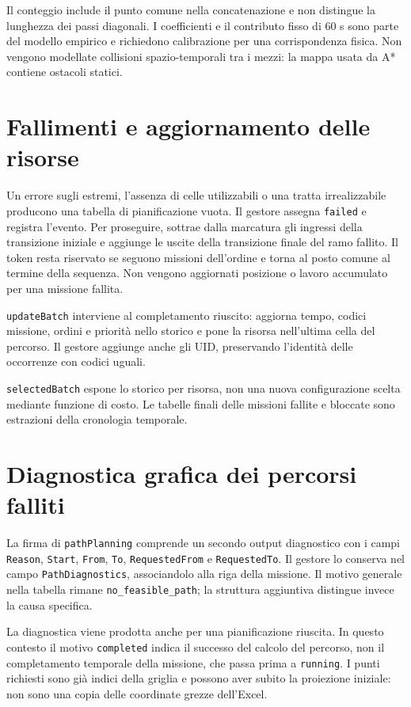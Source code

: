Il conteggio include il punto comune nella concatenazione e non distingue
la lunghezza dei passi diagonali. I coefficienti e il contributo fisso di
60 s sono parte del modello empirico e richiedono calibrazione per una
corrispondenza fisica. Non vengono modellate collisioni spazio-temporali
tra i mezzi: la mappa usata da A* contiene ostacoli statici.

\section{Fallimenti e aggiornamento delle risorse}
\label{sec:impl-fallimenti}

Un errore sugli estremi, l'assenza di celle utilizzabili o una tratta
irrealizzabile producono una tabella di pianificazione vuota. Il gestore
assegna \texttt{failed} e registra l'evento. Per proseguire, sottrae dalla
marcatura gli ingressi della transizione iniziale e aggiunge le uscite
della transizione finale del ramo fallito. Il token resta riservato se
seguono missioni dell'ordine e torna al posto comune al termine della sequenza.
Non vengono aggiornati posizione o lavoro accumulato per una missione fallita.

\texttt{updateBatch} interviene al completamento riuscito: aggiorna tempo,
codici missione, ordini e priorità nello storico e pone la risorsa
nell'ultima cella del percorso. Il gestore aggiunge anche gli UID, preservando
l'identità delle occorrenze con codici uguali.

\texttt{selectedBatch} espone lo storico per risorsa, non una nuova
configurazione scelta mediante funzione di costo. Le tabelle finali delle
missioni fallite e bloccate sono estrazioni della cronologia temporale.
\section{Diagnostica grafica dei percorsi falliti}
\label{sec:impl-diagnostica}

La firma di \texttt{pathPlanning} comprende un secondo output diagnostico
con i campi \texttt{Reason}, \texttt{Start}, \texttt{From}, \texttt{To},
\texttt{RequestedFrom} e \texttt{RequestedTo}. Il gestore lo conserva
nel campo \texttt{PathDiagnostics}, associandolo alla riga della missione.
Il motivo generale nella tabella rimane \texttt{no\_feasible\_path};
la struttura aggiuntiva distingue invece la causa specifica.

La diagnostica viene prodotta anche per una pianificazione riuscita.
In questo contesto il motivo \texttt{completed} indica il successo del
calcolo del percorso, non il completamento temporale della missione, che
passa prima a \texttt{running}. I punti richiesti sono già indici della
griglia e possono aver subito la proiezione iniziale: non sono una copia
delle coordinate grezze dell'Excel.

